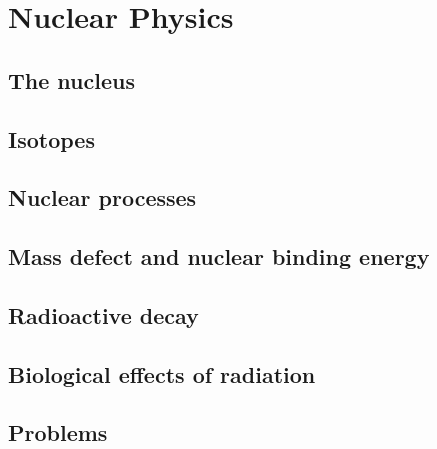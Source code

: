 \section{Nuclear Physics}
\subsection{The nucleus}


\subsection{Isotopes}


\subsection{Nuclear processes}


\subsection{Mass defect and nuclear binding energy}


\subsection{Radioactive decay}


\subsection{Biological effects of radiation}


\subsection*{Problems}

\pagebreak